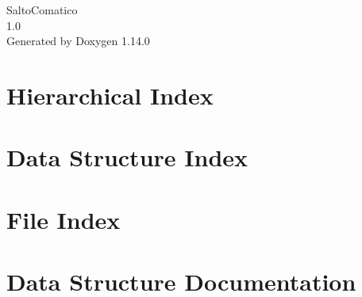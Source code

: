 \documentclass[twoside]{book}
\newcommand{\+}{\discretionary{\mbox{\scriptsize$\hookleftarrow$}}{}{}}
\newcommand{\clearemptydoublepage}{%
    \newpage{\pagestyle{empty}\cleardoublepage}%
  }
\begin{document}
  \raggedbottom
    \hypersetup{pageanchor=false,
                bookmarksnumbered=true,
                pdfencoding=unicode
               }
  \begin{titlepage}
  \vspace*{7cm}
  \begin{center}%
  {\Large Salto\+Comatico}\\
  [1ex]\large 1.\+0 \\
  \vspace*{1cm}
  {\large Generated by Doxygen 1.14.0}\\
  \end{center}
  \end{titlepage}
  \clearemptydoublepage
  \tableofcontents
  \clearemptydoublepage
  \hypersetup{pageanchor=true}
\chapter{Hierarchical Index}

\chapter{Data Structure Index}

\chapter{File Index}

\chapter{Data Structure Documentation}









































\end{document}
